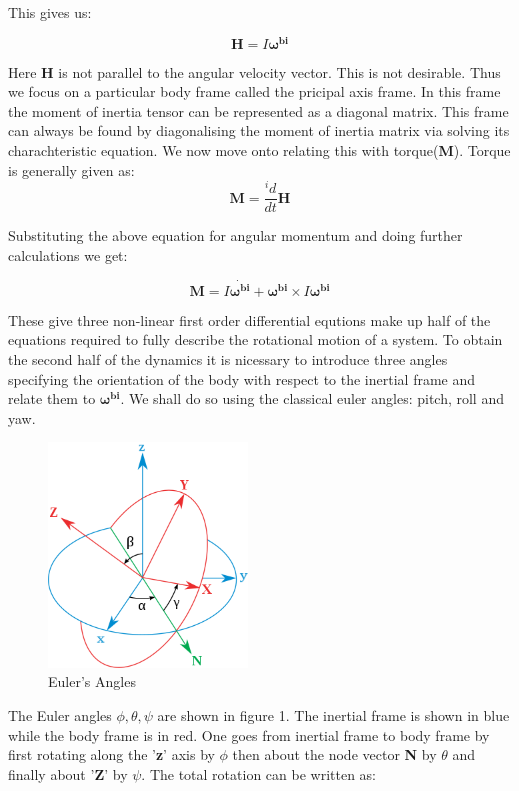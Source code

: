 \documentclass[12pt, letterpaper]{article}
\begin{document}
This gives us:

\begin{displaymath}
\mathbf{H} = I \mathbf{\omega^{bi}}
\end{displaymath}

Here \textbf{H} is not parallel to the angular velocity vector. This is not desirable. Thus we focus on a particular body frame called the pricipal axis frame. In this frame the moment of inertia tensor can be represented as a diagonal matrix. This frame can always be found by diagonalising the moment of inertia matrix via solving its charachteristic equation. We now move onto relating this with torque(\textbf{M}). Torque is generally given as:
\begin{displaymath}
\mathbf{M} = \frac{{}^id}{dt}\mathbf{H}
\end{displaymath}

Substituting the above equation for angular momentum and doing further calculations we get:

\begin{displaymath}
\mathbf{M} = I\dot{\mathbf{\omega^{bi}}} + \mathbf{\omega^{bi}}\times I \mathbf{\omega^{bi}}
\end{displaymath}

These give three non-linear first order differential equtions make up half of the equations required to fully describe the rotational motion of a system. To obtain the second half of the dynamics it is nicessary to introduce three angles specifying the orientation of the body with respect to the inertial frame and relate them to $\mathbf{\omega^{bi}}$. We shall do so using the classical euler angles: pitch, roll and yaw.

\begin{figure}[h]
	\centering
    \includegraphics[width = 200px]{EulerAngles}
    \caption{Euler's Angles}
\end{figure}

The Euler angles $\phi,\theta,\psi$ are shown in figure 1. The inertial frame is shown in blue while the body frame is in red. One goes from inertial frame to body frame by first rotating along the '\textbf{z}' axis by $\phi$ then about the node vector \textbf{N} by $\theta$ and finally about '\textbf{Z}' by $\psi$. The total rotation can be written as:
\end{document}
